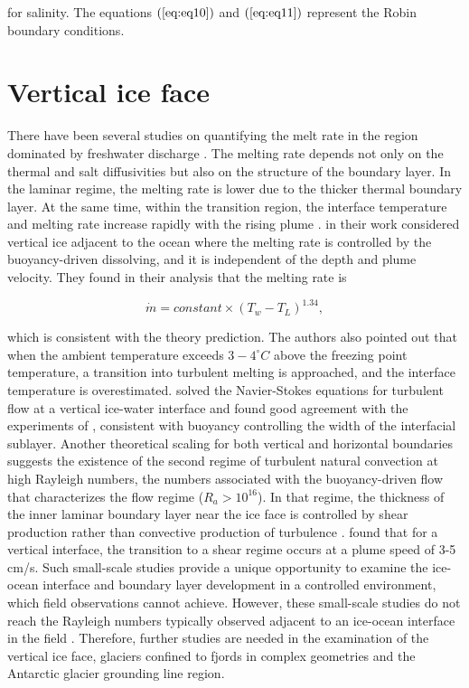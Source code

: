 \documentclass[11pt,a4paper]{article}
\begin{document}
	\noindent for salinity. The equations $(\ref{eq:eq10})$ and $(\ref{eq:eq11})$ represent the Robin boundary conditions.
	
	\section{Vertical ice face}
	
	There have been several studies on quantifying the melt rate in the region dominated by freshwater discharge \citep{wells2011melting, kerr2015dissolution, gayen2016simulation}.
     The melting rate depends not only on the thermal and salt diffusivities but also on the structure of the boundary layer. In the laminar regime, the melting rate is lower due to the thicker thermal boundary layer. At the same time, within the transition region, the interface temperature and melting rate increase rapidly with the rising plume \citep{gayen2016simulation}. \cite{kerr2015dissolution} in their work considered vertical ice adjacent to the ocean where the melting rate is controlled by the buoyancy-driven dissolving, and it is independent of the depth and plume velocity. They found in their analysis that the melting rate is 
	
	\begin{equation}
	    \dot{m} = constant\times (T_w-T_L)^{1.34},
	\end{equation}
	
	\noindent which is consistent with the theory prediction. The authors also pointed out that when the ambient temperature exceeds $3-4^{\circ} C$ above the freezing point temperature, a transition into turbulent melting is approached, and the interface temperature is overestimated. \cite{gayen2016simulation} solved the Navier-Stokes equations for turbulent flow at a vertical ice-water interface and found good agreement with the experiments of \cite{kerr2015dissolution}, consistent with buoyancy controlling the width of the interfacial sublayer. Another theoretical scaling for both vertical and horizontal boundaries suggests the existence of the second regime of turbulent natural convection at high Rayleigh numbers, the numbers associated with the buoyancy-driven flow that characterizes the flow regime ($R_a> 10^{16}$). In that regime, the thickness of the inner laminar boundary layer near the ice face is controlled by shear production rather than convective production of turbulence \citep{grossmann2000scaling, wells2008geophysical,kerr2015dissolution,gayen2016simulation}. \cite{mcconnochie2017using} found that for a vertical interface, the transition to a shear regime occurs at a plume speed of 3-5 cm/s. Such small-scale studies provide a unique opportunity to examine the ice-ocean interface and boundary layer development in a controlled environment, which field observations cannot achieve. However, these small-scale studies do not reach the Rayleigh numbers typically observed adjacent to an ice-ocean interface in the field \citep{malyarenko2020synthesis}. Therefore, further studies are needed in the examination of the vertical ice face, glaciers confined to fjords in complex geometries and the Antarctic glacier grounding line region.
\end{document}
